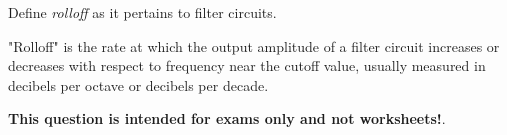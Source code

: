 

Define {\it rolloff} as it pertains to filter circuits.







"Rolloff" is the rate at which the output amplitude of a filter circuit increases or decreases with respect to frequency near the cutoff value, usually measured in decibels per octave or decibels per decade.







{\bf This question is intended for exams only and not worksheets!}.




